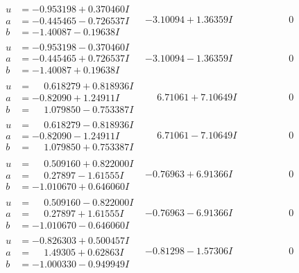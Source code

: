 \documentclass[1p]{elsarticle_modified}
\theoremstyle{definition}
\begin{document}
$$\begin{array}{c|c|c}
\begin{aligned}
u &= -0.953198 + 0.370460 I \\
a &= -0.445465 - 0.726537 I \\
b &= -1.40087 - 0.19638 I\end{aligned}
 & -3.10094 + 1.36359 I & \phantom{-0.000000 } 0 \\ \hline\begin{aligned}
u &= -0.953198 - 0.370460 I \\
a &= -0.445465 + 0.726537 I \\
b &= -1.40087 + 0.19638 I\end{aligned}
 & -3.10094 - 1.36359 I & \phantom{-0.000000 } 0 \\ \hline\begin{aligned}
u &= \phantom{-}0.618279 + 0.818936 I \\
a &= -0.82090 + 1.24911 I \\
b &= \phantom{-}1.079850 - 0.753387 I\end{aligned}
 & \phantom{-}6.71061 + 7.10649 I & \phantom{-0.000000 } 0 \\ \hline\begin{aligned}
u &= \phantom{-}0.618279 - 0.818936 I \\
a &= -0.82090 - 1.24911 I \\
b &= \phantom{-}1.079850 + 0.753387 I\end{aligned}
 & \phantom{-}6.71061 - 7.10649 I & \phantom{-0.000000 } 0 \\ \hline\begin{aligned}
u &= \phantom{-}0.509160 + 0.822000 I \\
a &= \phantom{-}0.27897 - 1.61555 I \\
b &= -1.010670 + 0.646060 I\end{aligned}
 & -0.76963 + 6.91366 I & \phantom{-0.000000 } 0 \\ \hline\begin{aligned}
u &= \phantom{-}0.509160 - 0.822000 I \\
a &= \phantom{-}0.27897 + 1.61555 I \\
b &= -1.010670 - 0.646060 I\end{aligned}
 & -0.76963 - 6.91366 I & \phantom{-0.000000 } 0 \\ \hline\begin{aligned}
u &= -0.826303 + 0.500457 I \\
a &= \phantom{-}1.49305 + 0.62863 I \\
b &= -1.000330 - 0.949949 I\end{aligned}
 & -0.81298 - 1.57306 I & \phantom{-0.000000 } 0 \\ \hline\begin{aligned}

\end{aligned}
\end{array}$$
\end{document}
